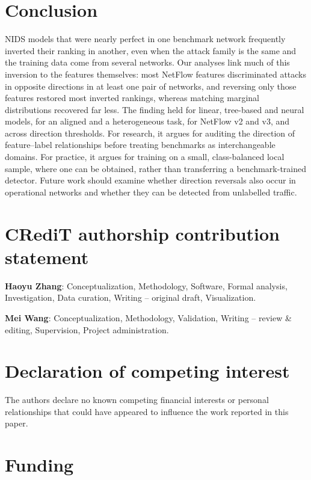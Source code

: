 \documentclass[preprint,12pt]{elsarticle}
\begin{document}
\section{Conclusion}
\label{sec:conclusion}

NIDS models that were nearly perfect in one benchmark network frequently inverted their ranking in another, even when the attack family is the same and the training data come from several networks. Our analyses link much of this inversion to the features themselves: most NetFlow features discriminated attacks in opposite directions in at least one pair of networks, and reversing only those features restored most inverted rankings, whereas matching marginal distributions recovered far less. The finding held for linear, tree-based and neural models, for an aligned and a heterogeneous task, for NetFlow v2 and v3, and across direction thresholds. For research, it argues for auditing the direction of feature--label relationships before treating benchmarks as interchangeable domains. For practice, it argues for training on a small, class-balanced local sample, where one can be obtained, rather than transferring a benchmark-trained detector. Future work should examine whether direction reversals also occur in operational networks and whether they can be detected from unlabelled traffic.

\section*{CRediT authorship contribution statement}

\textbf{Haoyu Zhang}: Conceptualization, Methodology, Software,
Formal analysis, Investigation, Data curation,
Writing -- original draft, Visualization.

\textbf{Mei Wang}: Conceptualization, Methodology,
Validation, Writing -- review \& editing,
Supervision, Project administration.

\section*{Declaration of competing interest}
The authors declare no known competing financial interests or personal relationships that could have appeared to influence the work reported in this paper.

\section*{Funding}
\end{document}
